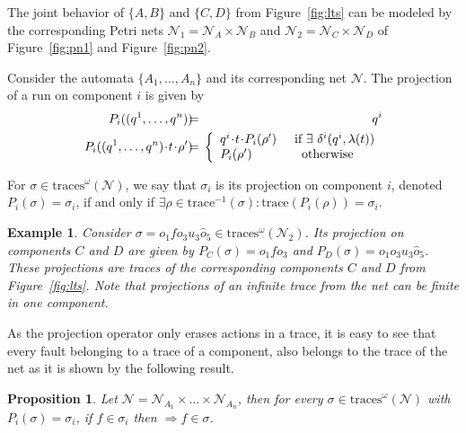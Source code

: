 \documentclass[a4paper]{article}
\newcommand{\imp}{\Rightarrow}
\newcommand{\trace}[1]{\textrm{trace}(#1)}
\newcommand{\camino}[1]{\textrm{trace}^{-1}(#1)}
\newcommand{\proj}[2]{P_{#1}({#2})}
\newcommand\netn{{\mathcal{N}}}
\newtheorem{exmp}{Example}
\newtheorem{prop}{Proposition}
\newcommand{\inftraces}[1]{\mathrm{traces}^{\omega}(#1)}
\begin{document}
The joint behavior of $\{A, B\}$ and $\{C, D\}$ from Figure~\ref{fig:lts} can be modeled by the corresponding Petri nets $\netn_1= \netn_A \times \netn_B$ and $\netn_2 = \netn_C \times \netn_D$ of Figure~\ref{fig:pn1} and Figure~\ref{fig:pn2}. 

Consider the automata $\{A_1,\dots, A_n\}$ and its corresponding net $\netn$. The projection of a run on component $i$ is given by
\begin{eqnarray*}
  P_i((q^1, \dots, q^n)) & \hspace{-0.2cm}=\hspace{-0.2cm} & q^i \\
  P_i((q^1, \dots, q^n)\!\cdot\!t\!\cdot\!\rho') & \hspace{-0.2cm}=\hspace{-0.2cm} & 
  \left \{
  \begin{array}{lcl}
  q^i\!\cdot\!t\!\cdot\!P_i(\rho') & &\hspace{-0.2cm}\text{if } \exists\ \delta^i(q^i, \lambda(t)) \\
  P_i(\rho') & & \text{otherwise}
  \end{array}
  \right.
\end{eqnarray*}

For $\sigma \in \inftraces \netn$, we say that $\sigma_i$ is its projection on component $i$, denoted $\proj i \sigma = \sigma_i$, if and only if $\exists \rho \in \camino \sigma: \trace{\proj i \rho}=\sigma_i$.

\begin{exmp}
  Consider $\sigma = o_1fo_3u_3\widehat{o}_5 \in \inftraces{\netn_2}$. Its projection on components $C$ and $D$ are given by $\proj C \sigma = o_1fo_3$ and $\proj D \sigma = o_1o_3u_3\widehat{o}_5$. These projections are traces of the corresponding components $C$ and $D$ from Figure~\ref{fig:lts}. Note that projections of an infinite trace from the net can be finite in one component.
\end{exmp}

As the projection operator only erases actions in a trace, it is easy to see that every fault belonging to a trace of a component, also belongs to the trace of the net as it is shown by the following result.

\begin{prop} 
  Let $\netn = \netn_{A_1}\times \dots \times \netn_{A_n}$, then for every $\sigma \in \inftraces \netn$ with $\proj i \sigma = \sigma_i$, if $f \in \sigma_i$ then $\imp f \in \sigma$.
  \label{prop:fault_proj}
\end{prop}
\end{document}
